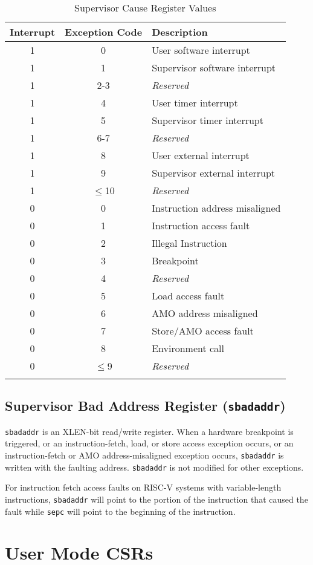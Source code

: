 \begin{longtable}[]{@{}ccl@{}}
\toprule
Interrupt & Exception Code & Description\tabularnewline
\midrule

\endhead

1 & 0 & User software interrupt\tabularnewline
1 & 1 & Supervisor software interrupt\tabularnewline
1 & 2-3 & \emph{Reserved}\tabularnewline
1 & 4 & User timer interrupt\tabularnewline
1 & 5 & Supervisor timer interrupt\tabularnewline
1 & 6-7 & \emph{Reserved}\tabularnewline
1 & 8 & User external interrupt\tabularnewline
1 & 9 & Supervisor external interrupt\tabularnewline
1 & $\leqslant$10 & \emph{Reserved}\tabularnewline
\midrule
0 & 0 & Instruction address misaligned\tabularnewline
0 & 1 & Instruction access fault\tabularnewline
0 & 2 & Illegal Instruction\tabularnewline
0 & 3 & Breakpoint\tabularnewline
0 & 4 & \emph{Reserved}\tabularnewline
0 & 5 & Load access fault\tabularnewline
0 & 6 & AMO address misaligned\tabularnewline
0 & 7 & Store/AMO access fault\tabularnewline
0 & 8 & Environment call\tabularnewline
0 & $\leqslant$9 & \emph{Reserved}\tabularnewline
\bottomrule
\caption{Supervisor Cause Register Values}
\label{tab:scause-reg-values}
\end{longtable}

\subsection{Supervisor Bad Address Register
(\texttt{sbadaddr})}\label{supervisor-bad-address-register-sbadaddr}

\texttt{sbadaddr} is an XLEN-bit read/write register. When a hardware breakpoint is triggered, or an instruction-fetch,
load, or store access exception occurs, or an instruction-fetch or AMO
address-misaligned exception occurs, \texttt{sbadaddr} is written with the
faulting address. \texttt{sbadaddr} is not modified for other exceptions.



For instruction fetch access faults on RISC-V systems with
variable-length instructions, \texttt{sbadaddr} will point to the portion of the
instruction that caused the fault while \texttt{sepc} will point to the beginning
of the instruction.

\pagebreak

\section{User Mode CSRs}\label{user-mode-csrs}

